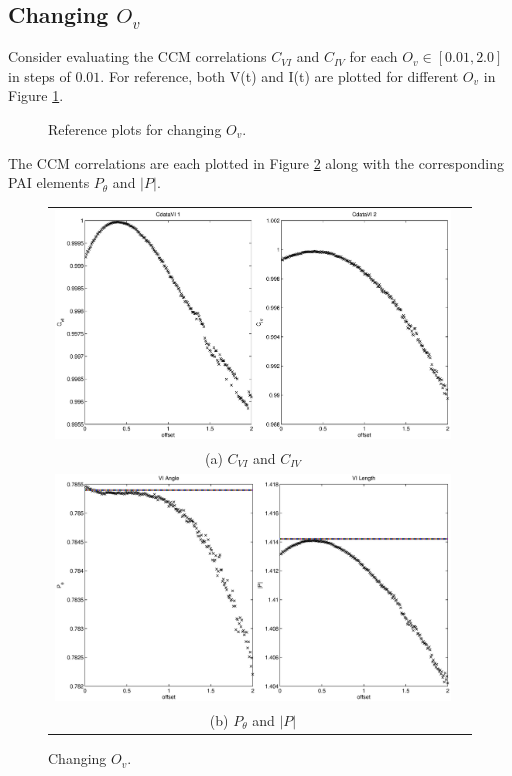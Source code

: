 \documentclass{article}
\begin{document}
\subsection{Changing $O_v$}
Consider evaluating the CCM correlations $C_{VI}$ and $C_{IV}$ for each $O_v\in[0.01,2.0]$ in steps of $0.01$.  For reference, both V(t) and I(t) are plotted for different $O_v$ in Figure \ref{fig:Ovref}.
\begin{figure}[H]
\caption{Reference plots for changing $O_v$.}
\label{fig:Ovref}
\end{figure}

The CCM correlations are each plotted in Figure \ref{fig:Ov} along with the corresponding PAI elements $P_\theta$ and $|P|$.
\begin{figure}[H]
\begin{tabular}{cc}
\includegraphics[scale=0.5]{RLcirc_varyV_offset2.eps} \\
(a) $C_{VI}$ and $C_{IV}$ \\[6pt]
\includegraphics[scale=0.5]{RLcirc_varyV_offset.eps} \\
(b) $P_\theta$ and $|P|$ \\[6pt]
\end{tabular}
\caption{Changing $O_v$.}
\label{fig:Ov}
\end{figure}
\end{document}
